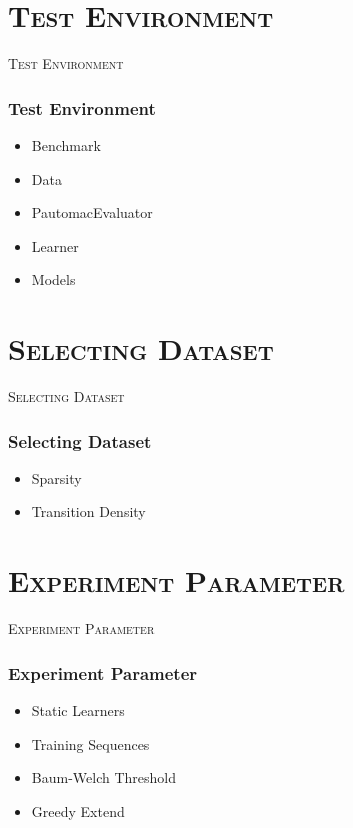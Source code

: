 \section{\scshape Test Environment}

\begin{frame}
\center \huge \scshape Test Environment
\end{frame}

\begin{frame}
  \frametitle{Test Environment}
  \begin{itemize}
		\item Benchmark
		\item Data
	  	\item PautomacEvaluator
	  	\item Learner
	  	\item Models
  \end{itemize}
\end{frame}

\section{\scshape Selecting Dataset}

\begin{frame}
	\center \huge \scshape Selecting Dataset
\end{frame}

\begin{frame}
	\frametitle{Selecting Dataset}
	\begin{itemize}
		\item Sparsity
		\item Transition Density
	\end{itemize}
\end{frame}

\section{\scshape Experiment Parameter}

\begin{frame}
	\center \huge \scshape Experiment Parameter
\end{frame}

\begin{frame}
	\frametitle{Experiment Parameter}
	\begin{itemize}
		\item Static Learners
		\item Training Sequences
		\item Baum-Welch Threshold
		\item Greedy Extend
	\end{itemize}
\end{frame}